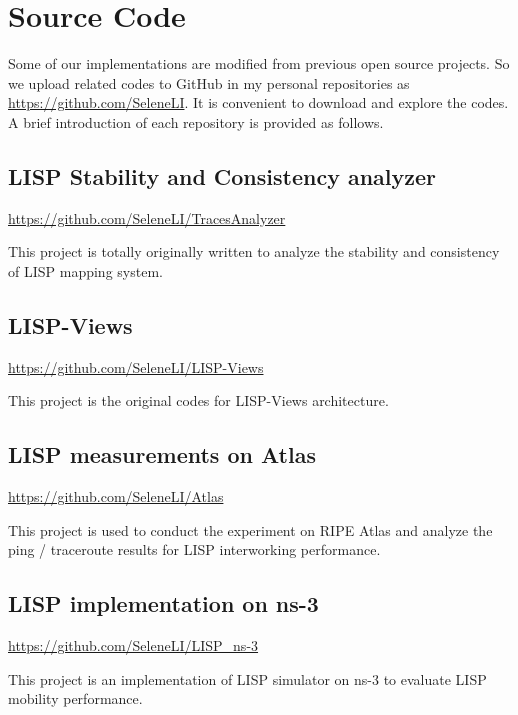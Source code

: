 \chapter{Source Code} 
Some of our implementations are modified from previous open source projects. So we upload related codes to GitHub in my personal repositories as \url{https://github.com/SeleneLI}. It is convenient to download and explore the codes. %
A brief introduction of each repository is provided as follows.


\section{LISP Stability and Consistency analyzer}
\url{https://github.com/SeleneLI/TracesAnalyzer}

This project is totally originally written to analyze the stability and consistency of LISP mapping system.


\section{LISP-Views}
\url{https://github.com/SeleneLI/LISP-Views}

This project is the original codes for LISP-Views architecture.


\section{LISP measurements on Atlas}
\url{https://github.com/SeleneLI/Atlas}

This project is used to conduct the experiment on RIPE Atlas and analyze the ping / traceroute results for LISP interworking performance. 


\section{LISP implementation on ns-3}
\url{https://github.com/SeleneLI/LISP_ns-3}

This project is an implementation of LISP simulator on ns-3 to evaluate LISP mobility performance.





